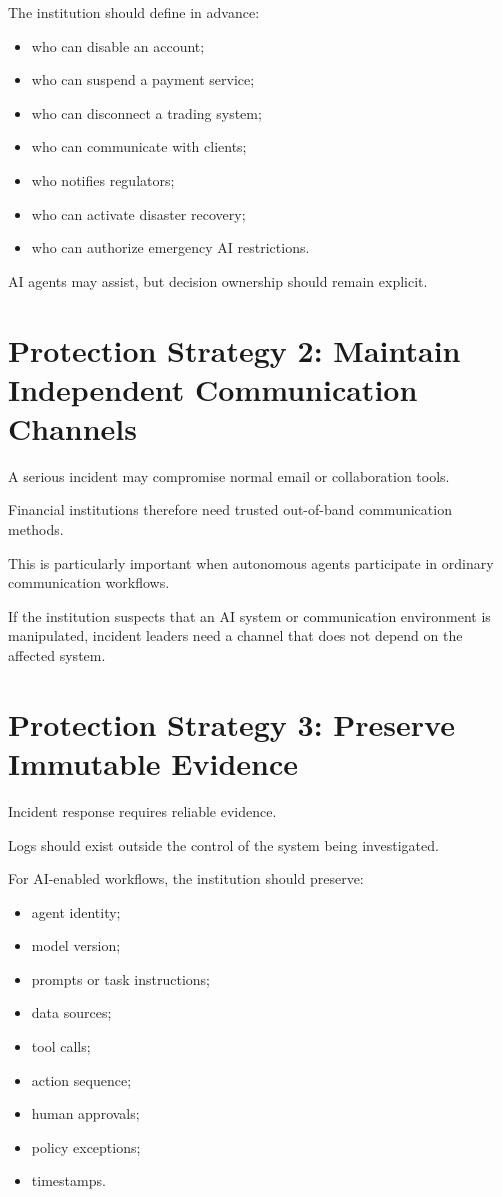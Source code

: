 The institution should define in advance:

\begin{itemize}
    \item who can disable an account;
    \item who can suspend a payment service;
    \item who can disconnect a trading system;
    \item who can communicate with clients;
    \item who notifies regulators;
    \item who can activate disaster recovery;
    \item who can authorize emergency AI restrictions.
\end{itemize}

AI agents may assist, but decision ownership should remain explicit.

\section{Protection Strategy 2: Maintain Independent Communication Channels}

A serious incident may compromise normal email or collaboration tools.

Financial institutions therefore need trusted out-of-band communication methods.

This is particularly important when autonomous agents participate in ordinary communication workflows.

If the institution suspects that an AI system or communication environment is manipulated, incident leaders need a channel that does not depend on the affected system.

\section{Protection Strategy 3: Preserve Immutable Evidence}

Incident response requires reliable evidence.

Logs should exist outside the control of the system being investigated.

For AI-enabled workflows, the institution should preserve:

\begin{itemize}
    \item agent identity;
    \item model version;
    \item prompts or task instructions;
    \item data sources;
    \item tool calls;
    \item action sequence;
    \item human approvals;
    \item policy exceptions;
    \item timestamps.
\end{itemize}

